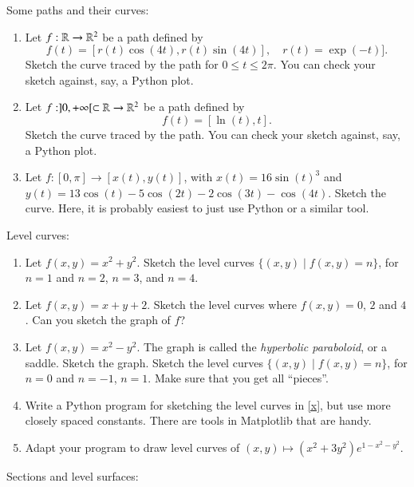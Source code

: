 \documentclass[12pt]{report}
\begin{document}
Some paths and their curves:
\begin{enumerate}
    \item {} Let $f : \mathbb{R} \to \mathbb{R}^2$ be a path defined by
    \[ f(t) = [r(t)\cos(4t), r(t)\sin(4t)], \quad r(t) = \exp(-t)]. \]
    Sketch the curve traced by the path for $0 \leq t \leq 2\pi$. You can check your sketch against, say, a Python plot.
    \item Let $f : ]0,+\infty[ \subset \mathbb{R} \to \mathbb{R}^2$ be a path defined by
    \[ f(t) = [\ln(t), t]. \]
    Sketch the curve traced by the path. You can check your sketch against, say, a Python plot.
    \item Let $f : [0,\pi] \to [x(t),y(t)]$, with
    $x(t) = 16\sin(t)^3$ and $y(t) = 13\cos(t) - 5\cos(2t) - 2\cos(3t) - \cos(4t)$. Sketch the curve. Here, it is probably easiest to just use Python or a similar tool.
\end{enumerate}

Level curves:
\begin{enumerate}[resume]
\item {} Let $f(x,y) = x^2 + y^2$. Sketch the level curves $\{(x,y) \mid f(x,y) = n\}$, for $n = 1$ and $n=2$, $n=3$, and $n=4$.
\item Let $f(x,y) = x + y + 2$. Sketch the level curves where $f(x,y)=0$, $2$ and $4$. Can you sketch the graph of $f$?
\item\label{x} Let $f(x,y) = x^2 - y^2$. The graph is called the \emph{hyperbolic paraboloid}, or a saddle. Sketch the graph. Sketch the level curves $\{(x,y) \mid f(x,y) = n\}$, for $n = 0$ and $n=-1$, $n=1$. Make sure that you get all ``pieces''.
\item Write a Python program for sketching the level curves in \ref{x}, but use more closely spaced constants. There are tools in Matplotlib that are handy.
\item Adapt your program to draw level curves of $(x,y)\mapsto (x^2 + 3y^2)e^{1-x^2-y^2}$.
\end{enumerate}

Sections and level surfaces:
\end{document}
